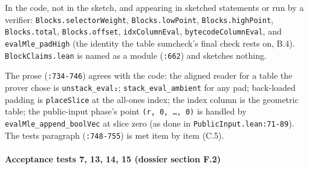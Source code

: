In the code, not in the sketch, and appearing in sketched statements or run by a verifier: \texttt{Blocks.\allowbreak{}selectorWeight}, \texttt{Blocks.\allowbreak{}lowPoint}, \texttt{Blocks.\allowbreak{}highPoint}, \texttt{Blocks.\allowbreak{}total}, \texttt{Blocks.\allowbreak{}offset}, \texttt{idxColumnEval}, \texttt{bytecodeColumnEval}, and \texttt{evalMle\_\allowbreak{}padHigh} (the identity the table sumcheck's final check rests on, B.4). \texttt{BlockClaims.\allowbreak{}lean} is named as a module (\texttt{:662}) and sketches nothing.

The prose (\texttt{:734-{}746}) agrees with the code: the aligned reader for a table the prover chose is \texttt{unstack\_\allowbreak{}eval₂}; \texttt{stack\_\allowbreak{}eval\_\allowbreak{}ambient} for any pad; back-loaded padding is \texttt{placeSlice} at the all-ones index; the index column is the geometric table; the public-input phase's point \texttt{(\allowbreak{}r,\allowbreak{} 0,\allowbreak{} …,\allowbreak{} 0)} is handled by \texttt{evalMle\_\allowbreak{}append\_\allowbreak{}boolVec} at slice zero (as done in \texttt{PublicInput.\allowbreak{}lean:71-{}89}). The tests paragraph (\texttt{:748-{}755}) is met item by item (C.5).

\paragraph{Acceptance tests 7, 13, 14, 15 (dossier section F.2)}\label{sec:gen-layer1-F2}

